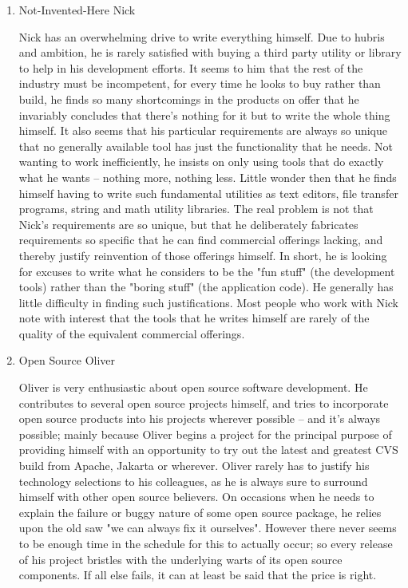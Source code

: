 \documentclass{article}
\begin{document}
\begin{enumerate}
\item Not-Invented-Here Nick
\label{sec:orgheadline17}

Nick has an overwhelming drive to write everything himself. Due to
hubris and ambition, he is rarely satisfied with buying a third party
utility or library to help in his development efforts. It seems to him
that the rest of the industry must be incompetent, for every time he
looks to buy rather than build, he finds so many shortcomings in the
products on offer that he invariably concludes that there's nothing for
it but to write the whole thing himself. It also seems that his
particular requirements are always so unique that no generally available
tool has just the functionality that he needs. Not wanting to work
inefficiently, he insists on only using tools that do exactly what he
wants -- nothing more, nothing less. Little wonder then that he finds
himself having to write such fundamental utilities as text editors, file
transfer programs, string and math utility libraries. The real problem
is not that Nick's requirements are so unique, but that he deliberately
fabricates requirements so specific that he can find commercial
offerings lacking, and thereby justify reinvention of those offerings
himself. In short, he is looking for excuses to write what he considers
to be the "fun stuff" (the development tools) rather than the "boring
stuff" (the application code). He generally has little difficulty in
finding such justifications. Most people who work with Nick note with
interest that the tools that he writes himself are rarely of the quality
of the equivalent commercial offerings.

\item Open Source Oliver
\label{sec:orgheadline18}

Oliver is very enthusiastic about open source software development. He
contributes to several open source projects himself, and tries to
incorporate open source products into his projects wherever possible --
and it's always possible; mainly because Oliver begins a project for the
principal purpose of providing himself with an opportunity to try out
the latest and greatest CVS build from Apache, Jakarta or wherever.
Oliver rarely has to justify his technology selections to his
colleagues, as he is always sure to surround himself with other open
source believers. On occasions when he needs to explain the failure or
buggy nature of some open source package, he relies upon the old saw "we
can always fix it ourselves". However there never seems to be enough
time in the schedule for this to actually occur; so every release of his
project bristles with the underlying warts of its open source
components. If all else fails, it can at least be said that the price is
right.


\end{enumerate}
\end{document}
